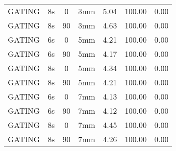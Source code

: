 \begin{table}[H]
\begin{tabular}{|c||c|c|c||c|c|c|}
GATING & 8s & 0 & 3mm & 5.04 & 100.00 & 0.00 \\
GATING & 8s & 90 & 3mm & 4.63 & 100.00 & 0.00 \\
GATING & 6s & 0 & 5mm & 4.21 & 100.00 & 0.00 \\
GATING & 6s & 90 & 5mm & 4.17 & 100.00 & 0.00 \\
GATING & 8s & 0 & 5mm & 4.34 & 100.00 & 0.00 \\
GATING & 8s & 90 & 5mm & 4.21 & 100.00 & 0.00 \\
GATING & 6s & 0 & 7mm & 4.13 & 100.00 & 0.00 \\
GATING & 6s & 90 & 7mm & 4.12 & 100.00 & 0.00 \\
GATING & 8s & 0 & 7mm & 4.45 & 100.00 & 0.00 \\
GATING & 8s & 90 & 7mm & 4.26 & 100.00 & 0.00 \\
    \hline\hline 
  \end{tabular}
\end{table}

\newpage

